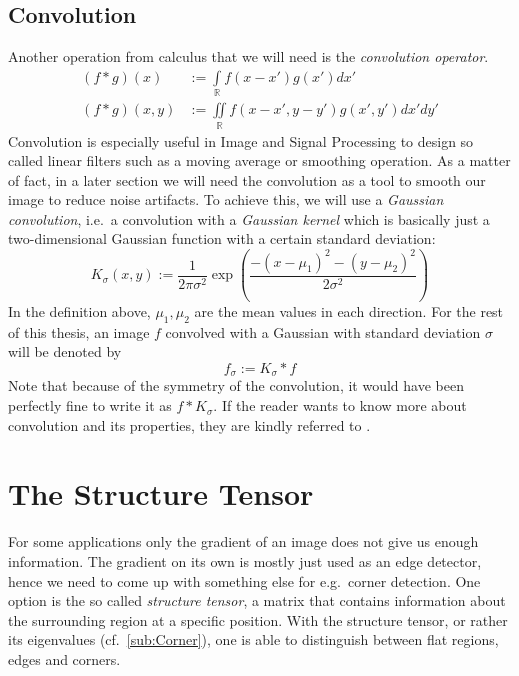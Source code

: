 \subsection{Convolution}
Another operation from calculus that we will need is the \textit{convolution operator}.\\
\begin{align}
    (f * g)(x) &:= \int\limits_\mathbb{R} f(x-x')g(x')dx'\label{eq:1DConv}\\
    (f * g)(x, y) &:= \iint\limits_\mathbb{R} f(x-x', y-y')g(x', y')dx'dy'\label{eq:2DConv}
\end{align}
Convolution is especially useful in Image and Signal Processing to design so called linear filters
such as a moving average or smoothing operation\cite{ipcv19-02}\cite{dspguide}. As a matter of fact, in a later
section we will need the convolution as a tool to smooth our image to reduce noise artifacts. To
achieve this, we will use a \textit{Gaussian convolution}, i.e.\ a convolution with a
\textit{Gaussian kernel} which is basically just a two-dimensional Gaussian function with a certain
standard deviation\cite{ipcv19-02}:
\begin{equation}
    K_\sigma (x, y) := \frac{1}{2\pi\sigma^2}\exp\left(\frac{-(x-\mu_1)^2 - (y -
            \mu_2)^2}{2\sigma^2}\right)
\end{equation}
In the definition above, $\mu_1, \mu_2$ are the mean values in each direction.
For the rest of this thesis, an image $f$ convolved with a Gaussian with standard deviation $\sigma$
will be denoted by \[f_\sigma := K_\sigma * f\]
Note that because of the symmetry of the
convolution, it would have been perfectly fine to write it as $f * K_\sigma$. If the reader wants
to know more about convolution and its properties, they are kindly referred to \cite{dspguide}.

\section{The Structure Tensor}\label{sec:Structure}
For some applications only the gradient of an image does not give us enough information. The
gradient on its own is mostly just used as an edge detector, hence we need to come up with
something else for e.g.\ corner detection\cite{ipcv19-13}. One option is the so called \textit{structure tensor}, a
matrix that contains information about the surrounding region at a specific position. With the
structure tensor, or rather its eigenvalues (cf.~\ref{sub:Corner}), one is able to
distinguish between flat regions, edges and corners.
